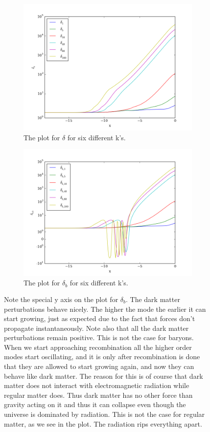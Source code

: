 \documentclass[a4paper]{report}
\begin{document}
\begin{figure}[ht]
\begin{subfigure}{.5\textwidth}
  \includegraphics[width=\textwidth]{delta.png}
 \caption{The plot for $\delta$ for six different k's.}
 \label{fig:delta}
\end{subfigure}
\begin{subfigure}{.5\textwidth}
\includegraphics[width=\textwidth]{deltab.png}
 \caption{The plot for $\delta_b$ for six different k's.}
 \label{fig:deltab}
\end{subfigure}
\caption{Note the special y axis on the plot for $\delta_b$. The dark matter perturbations behave nicely. The higher the mode the earlier it can start growing, just as expected due to the fact that forces don't propagate instantaneously. Note also that all the dark matter perturbations remain positive. This is not the case for baryons. When we start approaching recombination all the higher order modes start oscillating, and it is only after recombination is done that they are allowed to start growing again, and now they can behave like dark matter. The reason for this is of course that dark matter does not interact with electromagnetic radiation while regular matter does. Thus dark matter has no other force than gravity acting on it and thus it can collapse even though the universe is dominated by radiation. This is not the case for regular matter, as we see in the plot. The radiation rips everything apart.}

\end{figure}
\end{document}
